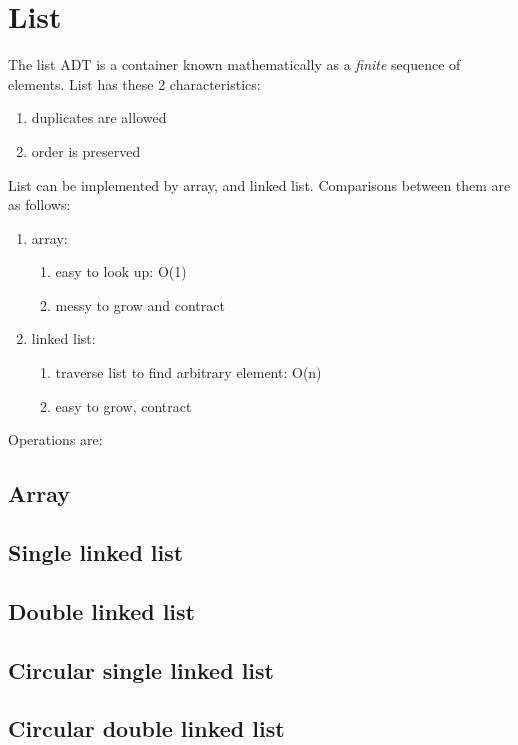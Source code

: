 \documentclass[12pt, a4paper]{report}
\begin{document}
    \section{List}
    The list ADT is a container known mathematically as a \emph{finite} sequence of elements. List has these 2 characteristics:
    \begin{enumerate}
        \item duplicates are allowed
        \item order is preserved
    \end{enumerate}
    List can be implemented by array, and linked list. Comparisons between them are as follows:
    \begin{enumerate}
        \item array: 
        \begin{enumerate}
            \item easy to look up: O(1)
            \item messy to grow and contract
        \end{enumerate}
        \item linked list:
        \begin{enumerate}
            \item traverse list to find arbitrary element: O(n)
            \item easy to grow, contract
        \end{enumerate}
    \end{enumerate}
    Operations are:
    
        \subsection{Array}
        \subsection{Single linked list}
        \subsection{Double linked list}
        \subsection{Circular single linked list}
        \subsection{Circular double linked list}
    
\end{document}
